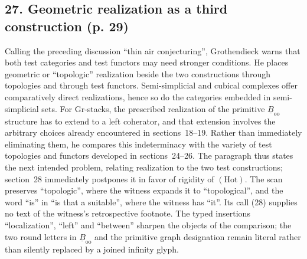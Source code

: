 \subsection*{27. Geometric realization as a third construction (p. 29)}
Calling the preceding discussion ``thin air conjecturing'', Grothendieck warns that both test categories and test functors may need stronger conditions. He places geometric or ``topologic'' realization beside the two constructions through topologies and through test functors. Semi-simplicial and cubical complexes offer comparatively direct realizations, hence so do the categories embedded in semi-simplicial sets. For Gr-stacks, the prescribed realization of the primitive $\underline B_{\mathrm{oo}}$ structure has to extend to a left coherator, and that extension involves the arbitrary choices already encountered in sections~18--19. Rather than immediately eliminating them, he compares this indeterminacy with the variety of test topologies and functors developed in sections~24--26. The paragraph thus states the next intended problem, relating realization to the two test constructions; section~28 immediately postpones it in favor of rigidity of $(\mathrm{Hot})$. The scan preserves ``topologic'', where the witness expands it to ``topological'', and the word ``is'' in ``is that a suitable'', where the witness has ``it''. Its call (28) supplies no text of the witness's retrospective footnote. The typed insertions ``localization'', ``left'' and ``between'' sharpen the objects of the comparison; the two round letters in $\underline B_{\mathrm{oo}}$ and the primitive graph designation remain literal rather than silently replaced by a joined infinity glyph.

